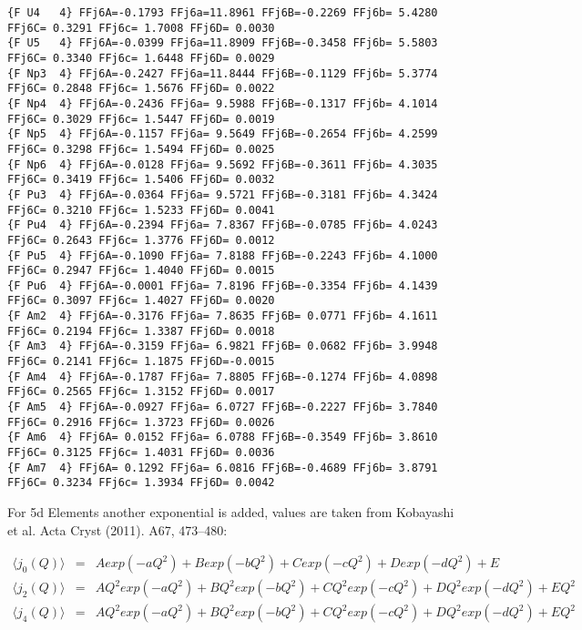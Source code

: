 {\begin{verbatim}
{F U4   4} FFj6A=-0.1793 FFj6a=11.8961 FFj6B=-0.2269 FFj6b= 5.4280 FFj6C= 0.3291 FFj6c= 1.7008 FFj6D= 0.0030 
{F U5   4} FFj6A=-0.0399 FFj6a=11.8909 FFj6B=-0.3458 FFj6b= 5.5803 FFj6C= 0.3340 FFj6c= 1.6448 FFj6D= 0.0029 
{F Np3  4} FFj6A=-0.2427 FFj6a=11.8444 FFj6B=-0.1129 FFj6b= 5.3774 FFj6C= 0.2848 FFj6c= 1.5676 FFj6D= 0.0022 
{F Np4  4} FFj6A=-0.2436 FFj6a= 9.5988 FFj6B=-0.1317 FFj6b= 4.1014 FFj6C= 0.3029 FFj6c= 1.5447 FFj6D= 0.0019 
{F Np5  4} FFj6A=-0.1157 FFj6a= 9.5649 FFj6B=-0.2654 FFj6b= 4.2599 FFj6C= 0.3298 FFj6c= 1.5494 FFj6D= 0.0025 
{F Np6  4} FFj6A=-0.0128 FFj6a= 9.5692 FFj6B=-0.3611 FFj6b= 4.3035 FFj6C= 0.3419 FFj6c= 1.5406 FFj6D= 0.0032 
{F Pu3  4} FFj6A=-0.0364 FFj6a= 9.5721 FFj6B=-0.3181 FFj6b= 4.3424 FFj6C= 0.3210 FFj6c= 1.5233 FFj6D= 0.0041 
{F Pu4  4} FFj6A=-0.2394 FFj6a= 7.8367 FFj6B=-0.0785 FFj6b= 4.0243 FFj6C= 0.2643 FFj6c= 1.3776 FFj6D= 0.0012 
{F Pu5  4} FFj6A=-0.1090 FFj6a= 7.8188 FFj6B=-0.2243 FFj6b= 4.1000 FFj6C= 0.2947 FFj6c= 1.4040 FFj6D= 0.0015 
{F Pu6  4} FFj6A=-0.0001 FFj6a= 7.8196 FFj6B=-0.3354 FFj6b= 4.1439 FFj6C= 0.3097 FFj6c= 1.4027 FFj6D= 0.0020 
{F Am2  4} FFj6A=-0.3176 FFj6a= 7.8635 FFj6B= 0.0771 FFj6b= 4.1611 FFj6C= 0.2194 FFj6c= 1.3387 FFj6D= 0.0018 
{F Am3  4} FFj6A=-0.3159 FFj6a= 6.9821 FFj6B= 0.0682 FFj6b= 3.9948 FFj6C= 0.2141 FFj6c= 1.1875 FFj6D=-0.0015 
{F Am4  4} FFj6A=-0.1787 FFj6a= 7.8805 FFj6B=-0.1274 FFj6b= 4.0898 FFj6C= 0.2565 FFj6c= 1.3152 FFj6D= 0.0017 
{F Am5  4} FFj6A=-0.0927 FFj6a= 6.0727 FFj6B=-0.2227 FFj6b= 3.7840 FFj6C= 0.2916 FFj6c= 1.3723 FFj6D= 0.0026 
{F Am6  4} FFj6A= 0.0152 FFj6a= 6.0788 FFj6B=-0.3549 FFj6b= 3.8610 FFj6C= 0.3125 FFj6c= 1.4031 FFj6D= 0.0036 
{F Am7  4} FFj6A= 0.1292 FFj6a= 6.0816 FFj6B=-0.4689 FFj6b= 3.8791 FFj6C= 0.3234 FFj6c= 1.3934 FFj6D= 0.0042 

\end{verbatim}
}

For 5d Elements another exponential is added, values are taken from Kobayashi et al.
Acta Cryst (2011). A67, 473–480:

\begin{eqnarray}
\langle j_0(Q) \rangle&=&A exp(-aQ^2)+B exp(-bQ^2)+C exp(-cQ^2)+D exp(-dQ^2)+E \\
\langle j_2(Q) \rangle&=&A Q^2 exp(-aQ^2)+B Q^2 exp(-bQ^2)+C Q^2 exp(-cQ^2)+D Q^2 exp(-dQ^2)+ E Q^2 \\
\langle j_4(Q) \rangle&=&A Q^2 exp(-aQ^2)+B Q^2 exp(-bQ^2)+C Q^2 exp(-cQ^2)+D Q^2 exp(-dQ^2)+ E Q^2 
\end{eqnarray}

